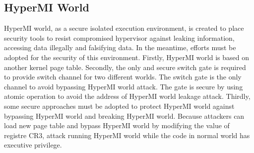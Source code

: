 \documentclass[conference]{IEEEtran}
\begin{document}

\subsection{HyperMI World} \label {HWorld}
HyperMI world, as a secure isolated execution environment, is created to place security tools to resist compromised hypervisor against leaking information, accessing data illegally and falsifying data. In the meantime, efforts must be adopted for the security of this environment. Firstly, HyperMI world is based on another kernel page table. Secondly, the only and secure switch gate is required to provide switch channel for two different worlds. The switch gate is the only channel to avoid bypassing HyperMI world attack. The gate is secure by using atomic operation to avoid the address of HyperMI world leakage attack. Thirdly, some secure approaches must be adopted to protect HyperMI world against bypassing HyperMI world and breaking HyperMI world. Because attackers can load new page table and bypass HyperMI world by modifying the value of registre CR3, attack running HyperMI world while the code in normal world has executive privilege.
\end{document}
